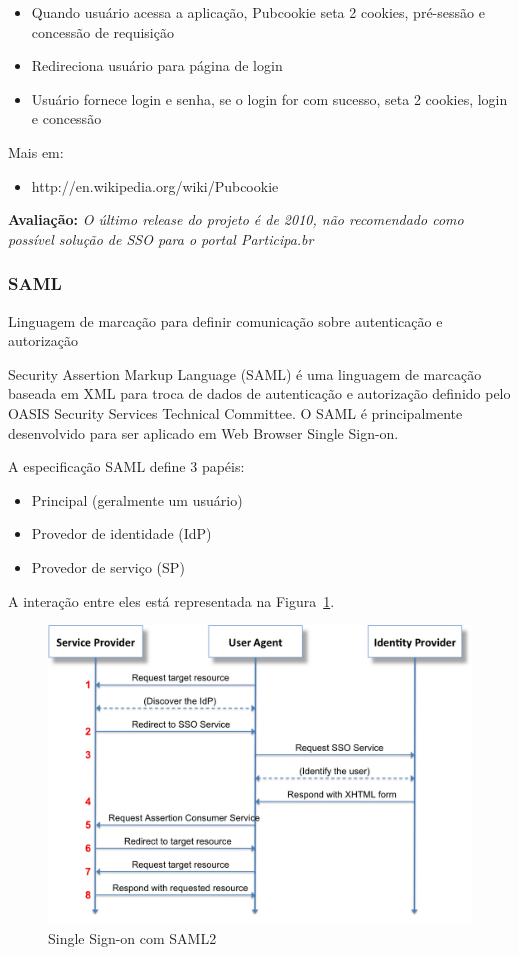 \documentclass[11pt]{article}
\begin{document}
\begin{itemize}
  \item{Quando usuário acessa a aplicação, Pubcookie seta 2 cookies, pré-sessão e concessão de requisição}
  \item{Redireciona usuário para página de login}
  \item{Usuário fornece login e senha, se o login for com sucesso, seta 2 cookies, login e concessão}
\end{itemize}

Mais em:
\begin{itemize}
  \item{http://en.wikipedia.org/wiki/Pubcookie}
\end{itemize}

{\bf Avaliação:} {\it O último release do projeto é de 2010, não recomendado
como possível solução de SSO para o portal Participa.br}

\subsubsection{SAML}

Linguagem de marcação para definir comunicação sobre autenticação e autorização

Security Assertion Markup Language (SAML) é uma linguagem de marcação baseada
em XML para troca de dados de autenticação e autorização definido pelo OASIS
Security Services Technical Committee. O SAML é principalmente desenvolvido
para ser aplicado em Web Browser Single Sign-on.

A especificação SAML define 3 papéis:
\begin{itemize}
  \item{Principal (geralmente um usuário)}
  \item{Provedor de identidade (IdP)}
  \item{Provedor de serviço (SP)}
\end{itemize}

A interação entre eles está representada na Figura~\ref{fig:saml2}.

\begin{figure}[h]
\center
\includegraphics[scale=0.5]{saml2.png}
\caption{Single Sign-on com SAML2}
\label{fig:saml2}
\end{figure}
\end{document}
